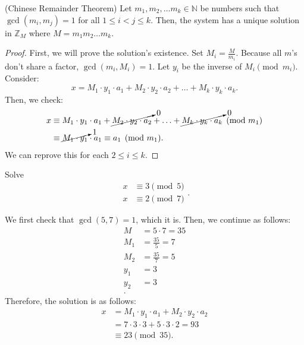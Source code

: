\documentclass[a4paper]{article}
\begin{document}
\begin{theorem}
	(Chinese Remainder Theorem) Let \( m_{1},m_{2},\ldots m_k \in \mathbb{N}\) be numbers such that \( \gcd(m_i,m_j)=1 \) for all \( 1 \le  i < j \le  k \). Then, the system has a unique solution in \( \mathbb{Z}_M \) where \( M=m_{1}m_{2}\ldots m_k \).
\end{theorem}

\begin{proof}
	First, we will prove the solution's existence. Set \( M_i =\frac{M}{m_i}\). Because all \( m \)'s don't share a factor, \( \gcd(m_i, M_i) = 1\). Let \( y_i \) be the inverse of \( M_i \pmod {m_i}\). Consider: \[
		x = M_1 \cdot y_{1} \cdot  a_{1} + M_{2} \cdot y_{2}\cdot a_{2}+ \ldots + M_{k} \cdot y_{k} \cdot a_{k}
	.\] Then, we check: 
	\begin{align*}
		x &\equiv M_{1}\cdot y_{1}\cdot a_{1}+ \cancelto{0}{M_{2}\cdot y_{2}\cdot a_{2}} + \ldots  + \cancelto{0}{M_k \cdot  y_k \cdot a_k} \pmod {m_1} \\
			& \equiv \cancelto{1}{M_{1}\cdot y_{1}}\cdot a_{1} \equiv a_{1} \pmod {m_1}
.\end{align*}
  We can reprove this for each \( 2\le i\le k \).
\end{proof}

\begin{eg}
	Solve \[
		\begin{matrix}
			x & \equiv 3 \pmod 5 \\
			x & \equiv 2 \pmod 7
		\end{matrix}
	.\] 
\end{eg}

We first check that \( \gcd(5,7)=1 \), which it is.
Then, we continue as follows:
\begin{align*}
	M&=5\cdot 7=35 \\
	M_1 &= \frac{35}{5} = 7 \\
	M_2 &= \frac{35}{7} = 5 \\
	y_{1} &= 3 \tag{Inverse of 7 mod 5} \\
	y_{2} &= 3 \tag{Inverse of 5 mod 7} \\
.\end{align*}
Therefore, the solution is as follows: 
\begin{align*} 
	x &= M_{1} \cdot  y_{1} \cdot  a_{1} + M_{2} \cdot  y_{2} \cdot  a_{2} \\
		&= 7 \cdot  3 \cdot 3 + 5 \cdot 3 \cdot  2 = 93\\
		& \equiv 23 \pmod {35}
.\end{align*}
\end{document}
